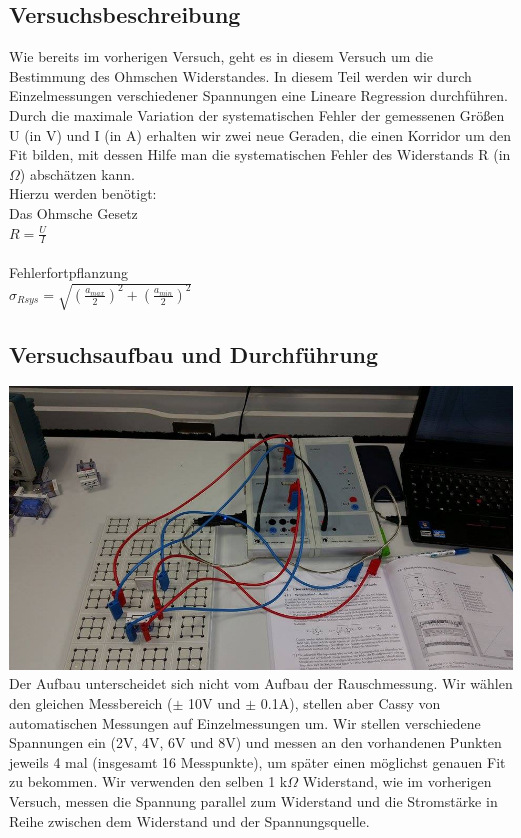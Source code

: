 \documentclass[12pt,a4paper]{article}
\begin{document}
\subsection{Versuchsbeschreibung}
Wie bereits im vorherigen Versuch, geht es in diesem Versuch um die Bestimmung des Ohmschen Widerstandes. In diesem Teil werden wir durch Einzelmessungen verschiedener Spannungen eine Lineare Regression durchführen. Durch die maximale Variation der systematischen Fehler der gemessenen Größen U (in V) und I (in A) erhalten wir zwei neue Geraden, die einen Korridor um den Fit bilden, mit dessen Hilfe man die systematischen Fehler des Widerstands R (in $\Omega$) abschätzen kann.\\
Hierzu werden benötigt:\\
Das Ohmsche Gesetz \\
$R = \frac{U}{I}$\\
\\
Fehlerfortpflanzung\\
$\sigma_{R sys} = \sqrt{(\frac{a_{max}}{2})^2+(\frac{a_{min}}{2})^2}$\\
\subsection{Versuchsaufbau und Durchführung}
\includegraphics[scale=0.35]{12000155_1207085929316467_1534534399_n.jpg}\\
Der Aufbau unterscheidet sich nicht vom Aufbau der Rauschmessung. Wir wählen den gleichen Messbereich ($\pm$ 10V und $\pm$ 0.1A), stellen aber Cassy von automatischen Messungen auf Einzelmessungen um. Wir stellen verschiedene Spannungen ein (2V, 4V, 6V und 8V) und messen an den vorhandenen Punkten jeweils 4 mal (insgesamt 16 Messpunkte), um später einen möglichst genauen Fit zu bekommen. Wir verwenden den selben 1 k$\Omega$ Widerstand, wie im vorherigen Versuch, messen die Spannung parallel zum Widerstand und die Stromstärke in Reihe zwischen dem Widerstand und der Spannungsquelle.\\
\end{document}
